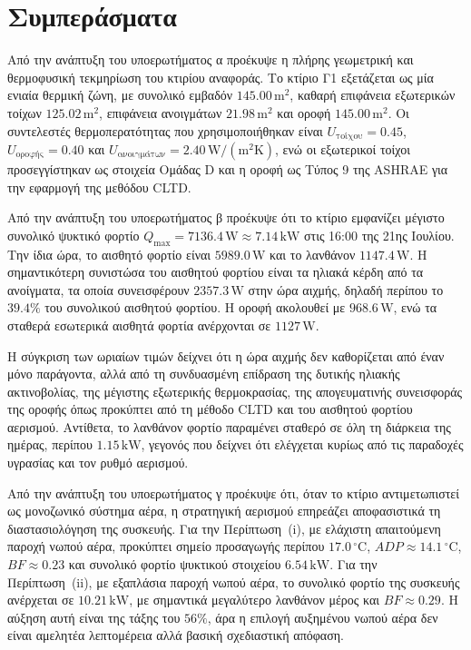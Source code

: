 \documentclass[12pt,a4paper]{article}
\begin{document}
\section{Συμπεράσματα}

Από την ανάπτυξη του υποερωτήματος α προέκυψε η πλήρης γεωμετρική και
θερμοφυσική τεκμηρίωση του κτιρίου αναφοράς. Το κτίριο Γ1 εξετάζεται ως μία ενιαία
θερμική ζώνη, με συνολικό εμβαδόν \(145.00\,\mathrm{m^2}\), καθαρή επιφάνεια
εξωτερικών τοίχων \(125.02\,\mathrm{m^2}\), επιφάνεια ανοιγμάτων
\(21.98\,\mathrm{m^2}\) και οροφή \(145.00\,\mathrm{m^2}\). Οι συντελεστές
θερμοπερατότητας που χρησιμοποιήθηκαν είναι \(U_{\text{τοίχου}}=0.45\),
\(U_{\text{οροφής}}=0.40\) και \(U_{\text{ανοιγμάτων}}=2.40\,\mathrm{W/(m^2K)}\),
ενώ οι εξωτερικοί τοίχοι προσεγγίστηκαν ως στοιχεία Ομάδας D και η οροφή ως
Τύπος 9 της ASHRAE για την εφαρμογή της μεθόδου CLTD.

Από την ανάπτυξη του υποερωτήματος β προέκυψε ότι το κτίριο εμφανίζει μέγιστο
συνολικό ψυκτικό φορτίο \(Q_{\max}=7136.4\,\mathrm{W}\approx 7.14\,\mathrm{kW}\)
στις 16:00 της 21ης Ιουλίου. Την ίδια ώρα, το αισθητό φορτίο είναι
\(5989.0\,\mathrm{W}\) και το λανθάνον \(1147.4\,\mathrm{W}\). Η σημαντικότερη
συνιστώσα του αισθητού φορτίου είναι τα ηλιακά κέρδη από τα ανοίγματα, τα οποία
συνεισφέρουν \(2357.3\,\mathrm{W}\) στην ώρα αιχμής, δηλαδή περίπου το \(39.4\%\)
του συνολικού αισθητού φορτίου. Η οροφή ακολουθεί με \(968.6\,\mathrm{W}\), ενώ
τα σταθερά εσωτερικά αισθητά φορτία ανέρχονται σε \(1127\,\mathrm{W}\).

Η σύγκριση των ωριαίων τιμών δείχνει ότι η ώρα αιχμής δεν καθορίζεται από έναν
μόνο παράγοντα, αλλά από τη συνδυασμένη επίδραση της δυτικής ηλιακής ακτινοβολίας,
της μέγιστης εξωτερικής θερμοκρασίας, της απογευματινής συνεισφοράς της οροφής όπως
προκύπτει από τη μέθοδο \textenglish{CLTD} και του αισθητού φορτίου αερισμού.
Αντίθετα, το λανθάνον φορτίο παραμένει σταθερό
σε όλη τη διάρκεια της ημέρας, περίπου \(1.15\,\mathrm{kW}\), γεγονός που δείχνει
ότι ελέγχεται κυρίως από τις παραδοχές υγρασίας και τον ρυθμό αερισμού.

Από την ανάπτυξη του υποερωτήματος γ προέκυψε ότι, όταν το κτίριο αντιμετωπιστεί
ως μονοζωνικό σύστημα αέρα, η στρατηγική αερισμού επηρεάζει αποφασιστικά τη
διαστασιολόγηση της συσκευής. Για την Περίπτωση~(i), με ελάχιστη απαιτούμενη παροχή
νωπού αέρα, προκύπτει σημείο προσαγωγής περίπου
\(17.0\,^\circ\mathrm{C}\), \(ADP \approx 14.1\,^\circ\mathrm{C}\),
\(BF \approx 0.23\) και συνολικό φορτίο ψυκτικού στοιχείου
\(6.54\,\mathrm{kW}\). Για την Περίπτωση~(ii), με εξαπλάσια παροχή νωπού αέρα,
το συνολικό φορτίο της συσκευής ανέρχεται σε \(10.21\,\mathrm{kW}\), με
σημαντικά μεγαλύτερο λανθάνον μέρος και \(BF \approx 0.29\). Η αύξηση αυτή είναι
της τάξης του \(56\%\), άρα η επιλογή αυξημένου νωπού αέρα δεν είναι αμελητέα
λεπτομέρεια αλλά βασική σχεδιαστική απόφαση.
\end{document}

